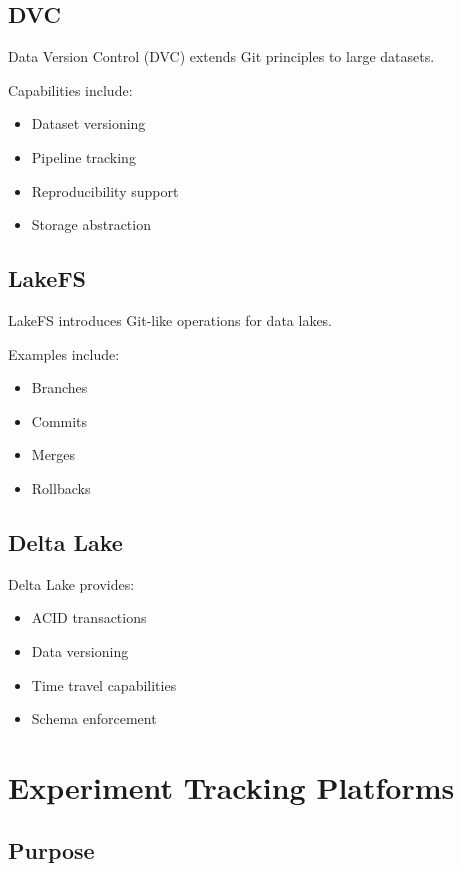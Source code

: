 \subsection{DVC}

Data Version Control (DVC) extends Git principles to large datasets.

Capabilities include:

\begin{itemize}
    \item Dataset versioning
    \item Pipeline tracking
    \item Reproducibility support
    \item Storage abstraction
\end{itemize}

\subsection{LakeFS}

LakeFS introduces Git-like operations for data lakes.

Examples include:

\begin{itemize}
    \item Branches
    \item Commits
    \item Merges
    \item Rollbacks
\end{itemize}

\subsection{Delta Lake}

Delta Lake provides:

\begin{itemize}
    \item ACID transactions
    \item Data versioning
    \item Time travel capabilities
    \item Schema enforcement
\end{itemize}

\section{Experiment Tracking Platforms}

\subsection{Purpose}

